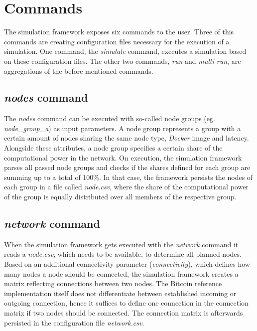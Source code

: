 \section{Commands}
\label{chap:commands}

The simulation framework exposes six commands to the user.
Three of this commands are creating configuration files necessary for the execution of a simulation. One command, the \textit{simulate} command, executes a simulation based on these configuration files.
The other two commands, \textit{run} and \textit{multi-run}, are aggregations of the before mentioned commands.

\subsection{\textit{nodes} command} \label{chap:nodes_command}

The \textit{nodes} command can be executed with so-called node groups (eg. \textit{node\_group\_a}) as input parameters.
A node group represents a group with a certain amount of nodes sharing the same node type, \textit{Docker} image and latency.
Alongside these attributes, a node group specifies a certain share of the computational power in the network.
On execution, the simulation framework parses all passed node groups and checks if the shares defined for each group are summing up to a total of 100\%.
In that case, the framework persists the nodes of each group in a file called \textit{node.csv}, where the share of the computational power of the group is equally distributed over all members of the respective group.

\subsection{\textit{network} command} \label{chap:network_command}

When the simulation framework gets executed with the \textit{network} command it reads a \textit{node.csv}, which needs to be available, to determine all planned nodes.
Based on an additional connectivity parameter (\textit{connectivity}), which defines how many nodes a node should be connected, the simulation framework creates a matrix reflecting connections between two nodes.
The Bitcoin reference implementation itself does not differentiate between established incoming or outgoing connection, hence it suffices to define one connection in the connection matrix if two nodes should be connected.
The connection matrix is afterwards persisted in the configuration file \textit{network.csv}.

